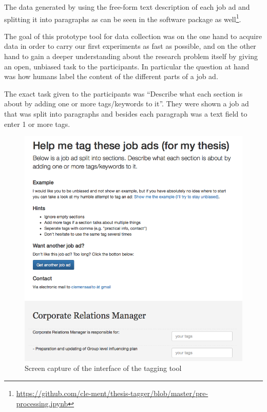 The data generated by using the free-form text description of each job ad and splitting it into paragraphs as can be seen in the software package as well\footnote{\url{https://github.com/cle-ment/thesis-tagger/blob/master/pre-processing.ipynb}}.

The goal of this prototype tool for data collection was on the one hand to acquire data in order to carry our first experiments as fast as possible, and on the other hand to gain a deeper understanding about the research problem itself by giving an open, unbiased task to the participants. In particular the question at hand was how humans label the content of the different parts of a job ad.

The exact task given to the participants was ``Describe what each section is about by adding one or more tags/keywords to it''. They were shown a job ad that was split into paragraphs and besides each paragraph was a text field to enter 1 or more tags.

\begin{figure}[h]
  \centering
  \includegraphics[width=\textwidth]{img/thesis-tagger-interface.png}
  \caption{Screen capture of the interface of the tagging tool}
\label{fig:thesis-tagger-interface}
\end{figure}


